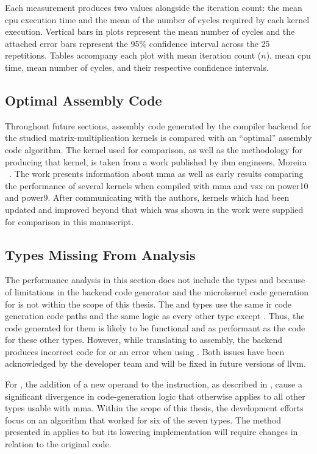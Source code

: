 \documentclass[\main/thesis.tex]{subfiles}
\begin{document}
Each measurement produces two values alongside the iteration count: the mean \gls{cpu} execution time and the mean of the number of cycles required by each kernel execution.
Vertical bars in plots represent the mean number of cycles and the attached error bars represent the 95\% confidence interval across the 25 repetitions.
Tables accompany each plot with mean iteration count ($n$), mean \gls{cpu} time, mean number of cycles, and their respective confidence intervals.

\subsection{Optimal Assembly Code}
Throughout future sections, assembly code generated by the compiler backend for the studied matrix-multiplication kernels is compared with an ``optimal'' assembly code algorithm.
The kernel used for comparison, as well as the methodology for producing that kernel, is taken from a work published by \gls{ibm} engineers, Moreira \etal~\autocite{moreira2021matrix}.
The work presents information about \gls{mma} as well as early results comparing the performance of several kernels when compiled with \gls{mma} and \gls{vsx} on \gls{power10} and \gls{power}9.
After communicating with the authors, kernels which had been updated and improved beyond that which was shown in the work were supplied for comparison in this manuscript.

\subsection{Types Missing From Analysis}
The performance analysis in this section does not include the types  and  because of limitations in the backend code generator and the microkernel code generation for  is not within the scope of this thesis.
The  and  types use the same \gls{ir} code generation code paths and the same logic as every other type except .
Thus, the code generated for them is  likely to be functional and as performant as the code for these other types.
However, while translating to assembly, the backend produces incorrect code for  or an error when using .
Both issues have been acknowledged by the developer team and will be fixed in future versions of \gls{llvm}.

For , the addition of a new operand to the instruction, as described in , cause a significant divergence in code-generation logic that otherwise applies to all other types usable with \gls{mma}.
Within the scope of this thesis, the development efforts focus on an algorithm that worked for six of the seven types.
The method presented in  applies to  but its \gls{lowering} implementation will require changes in relation to the original code.
\end{document}
